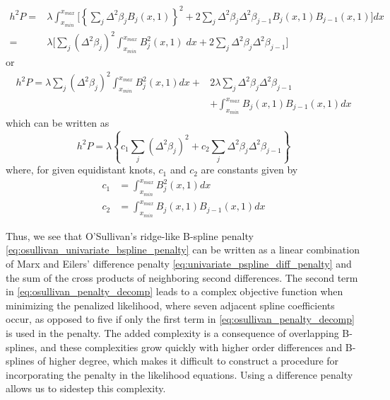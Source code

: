 \documentclass[12pt]{article}
\begin{document}
{\begin{align}
h^2 P = {} & \lambda \int_{x_{min}}^{x_{max}} \bigg[ \left\{ \sum_{j}  \Delta^2 \beta_j  B_j\left(x,1\right)  \right\}^2  + 2 \sum_{j}\Delta^2 \beta_j\Delta^2 \beta_{j-1}B_j\left(x,1\right)B_{j-1}\left(x,1\right) \bigg] dx \nonumber \\ 
= {} & \lambda \bigg[ \sum_j \left( \Delta^2\beta_j \right)^2 \int_{x_{min}}^{x_{max}} B_j^2\left(x,1\right)\;dx + 2 \sum_j \Delta^2 \beta_j\Delta^2 \beta_{j-1} \bigg]
\end{align}
\noindent
or
\begin{align}
h^2 P = \lambda \sum_j \left( \Delta^2\beta_j \right)^2 \int_{x_{min}}^{x_{max}} B_j^2\left(x,1\right) dx + {} & 2\lambda \sum_j \Delta^2 \beta_j \Delta^2 \beta_{j-1}  \nonumber \\ 
{} &+\int_{x_{min}}^{x_{max}} B_j\left(x,1\right)B_{j-1}\left(x,1\right) dx
\end{align}
\noindent
which can be written as
\begin{equation} \label{eq:osullivan_penalty_decomp}
h^2 P = \lambda\left\{c_1 \sum_j\left( \Delta^2 \beta_j\right)^2 + c_2 \sum_j\Delta^2 \beta_j\Delta^2 \beta_{j-1} \right\}
\end{equation}
\noindent
where, for given equidistant knots, $c_1$ and $c_2$ are constants given by
\begin{equation}
\begin{split}
c_1 & =   \int_{x_{min}}^{x_{max}} B_j^2\left(x,1\right) dx\\
c_2 & = \int_{x_{min}}^{x_{max}} B_j\left(x,1\right)B_{j-1}\left(x,1\right) dx
\end{split}
\end{equation}

Thus, we see that O'Sullivan's ridge-like B-spline penalty \ref{eq:osullivan_univariate_bspline_penalty} can be written as a linear combination of Marx and Eilers' difference penalty \ref{eq:univariate_pspline_diff_penalty} and the sum of the cross products of neighboring second differences. The second term in \ref{eq:osullivan_penalty_decomp} leads to a complex objective function when minimizing the penalized likelihood, where seven adjacent spline coefficients occur, as opposed to five if only the first term in \ref{eq:osullivan_penalty_decomp} is used in the penalty. The added complexity is a consequence of overlapping B-splines, and these complexities grow quickly with higher order differences and B-splines of higher degree, which makes it difficult to construct a procedure for incorporating the penalty in the likelihood equations. Using a difference penalty allows us to sidestep this complexity.

}
\end{document}
